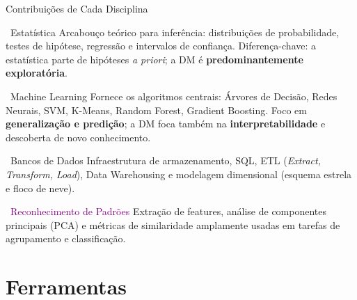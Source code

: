 \documentclass[aspectratio=169]{beamer}
\begin{document}
\begin{frame}{Contribuições de Cada Disciplina}
    \footnotesize
    \vspace{-0.57cm}
    \begin{block}{\textcolor{mineblue}{\faLineChart\ Estatística}}
        Arcabouço teórico para inferência: distribuições de probabilidade, testes de hipótese, regressão e intervalos de confiança. Diferença-chave: a estatística parte de hipóteses \textit{a priori}; a DM é \textbf{predominantemente exploratória}.
    \end{block}
    \vspace{0.15cm}
    \begin{block}{\textcolor{mineorange}{\faCogs\ Machine Learning}}
        Fornece os algoritmos centrais: Árvores de Decisão, Redes Neurais, SVM, K-Means, Random Forest, Gradient Boosting. Foco em \textbf{generalização e predição}; a DM foca também na \textbf{interpretabilidade} e descoberta de novo conhecimento.
    \end{block}
    \vspace{0.15cm}
    \begin{block}{\textcolor{minegreen}{\faDatabase\ Bancos de Dados}}
        Infraestrutura de armazenamento, SQL, ETL (\textit{Extract, Transform, Load}), Data Warehousing e modelagem dimensional (esquema estrela e floco de neve).
    \end{block}
    \vspace{0.15cm}
    \begin{block}{\textcolor{purple}{\faEye\ Reconhecimento de Padrões}}
        Extração de features, análise de componentes principais (PCA) e métricas de similaridade amplamente usadas em tarefas de agrupamento e classificação.
    \end{block}
\end{frame}

\section{Ferramentas}
\end{document}
